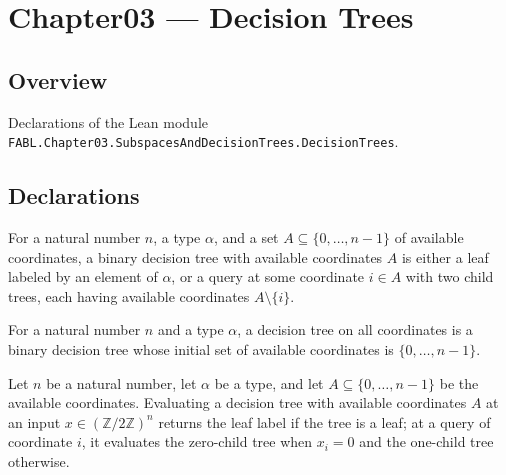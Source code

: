 \chapter{Chapter03 — Decision Trees}
\section{Overview}

Declarations of the Lean module \texttt{FABL.Chapter03.SubspacesAndDecisionTrees.DecisionTrees}.

\section{Declarations}

\begin{definition}
\leanok
{}
For a natural number $n$, a type $\alpha$, and a set $A\subseteq\{0,\ldots,n-1\}$ of
available coordinates, a binary decision tree with available coordinates $A$ is either a
leaf labeled by an element of $\alpha$, or a query at some coordinate $i\in A$ with two
child trees, each having available coordinates $A\setminus\{i\}$.
\end{definition}

\begin{definition}
\label{FABL.DecisionTree}
\leanok
{}
For a natural number $n$ and a type $\alpha$, a decision tree on all coordinates is a
binary decision tree whose initial set of available coordinates is $\{0,\ldots,n-1\}$.
\end{definition}

\begin{definition}
\leanok
{}
Let $n$ be a natural number, let $\alpha$ be a type, and let
$A\subseteq\{0,\ldots,n-1\}$ be the available coordinates. Evaluating a decision tree
with available coordinates $A$ at an input $x\in(\mathbb{Z}/2\mathbb{Z})^n$ returns the
leaf label if the tree is a leaf; at a query of coordinate $i$, it evaluates the
zero-child tree when $x_i=0$ and the one-child tree otherwise.
\end{definition}


